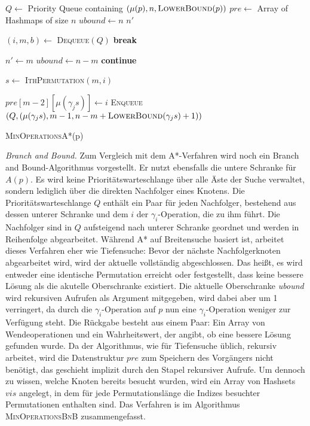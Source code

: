 \documentclass[a4paper, 10pt, ngerman]{article}
\begin{document}
\begin{algorithm}

    $Q \gets$ Priority Queue containing $(\mu(p), n, \textsc{LowerBound}(p))$ \;
    $pre \gets$ Array of Hashmaps of size $n$ \;
    $ubound \gets n$ \;
    $n'$ \;

    {
        $(i, m, b) \gets$ \textsc{Dequeue}$(Q)$ \;
        {
            \textbf{break} \;
        }

        {
            {
                $n' \gets m$ \;
                $ubound \gets n - m$ \;
            }
            \textbf{continue} \;
        }

        $s \gets$ \textsc{IthPermutation}$(m, i)$ \;

        {
            {
                $pre[m - 2][\mu(\gamma_j s)] \gets i$ \;
                \textsc{Enqueue}$(Q, (\mu(\gamma_j s), m - 1, n - m + \textsc{LowerBound}(\gamma_j s) + 1))$ \;
            }
        }
    }

     \;

    \caption{\textsc{MinOperationsA*}(p)}
\end{algorithm}
\bigskip

\emph{Branch and Bound.} Zum Vergleich mit dem A*-Verfahren wird noch ein Branch and Bound-Algorithmus vorgestellt. Er nutzt ebensfalls die untere Schranke für $A(p)$. Es wird keine Prioritätswarteschlange über alle Äste der Suche verwaltet, sondern lediglich über die direkten Nachfolger eines Knotens. Die Prioritätswarteschlange $Q$ enthält ein Paar für jeden Nachfolger, bestehend aus dessen unterer Schranke und dem $i$ der $\gamma_i$-Operation, die zu ihm führt. Die Nachfolger sind in $Q$ aufsteigend nach unterer Schranke geordnet und werden in Reihenfolge abgearbeitet. Während A* auf Breitensuche basiert ist, arbeitet dieses Verfahren eher wie Tiefensuche: Bevor der nächste Nachfolgerknoten abgearbeitet wird, wird der aktuelle vollständig abgeschlossen. Das heißt, es wird entweder eine identische Permutation erreicht oder festgestellt, dass keine bessere Lösung als die akutelle Oberschranke existiert. Die aktuelle Oberschranke \emph{ubound} wird rekursiven Aufrufen als Argument mitgegeben, wird dabei aber um 1 verringert, da durch die $\gamma_i$-Operation auf $p$ nun eine $\gamma_i$-Operation weniger zur Verfügung steht. Die Rückgabe besteht aus einem Paar: Ein Array von Wendeoperationen und ein Wahrheitswert, der angibt, ob eine bessere Lösung gefunden wurde. Da der Algorithmus, wie für Tiefensuche üblich, rekursiv arbeitet, wird die Datenstruktur $pre$ zum Speichern des Vorgängers nicht benötigt, das geschieht implizit durch den Stapel rekursiver Aufrufe. Um dennoch zu wissen, welche Knoten bereits besucht wurden, wird ein Array von Hashsets $vis$ angelegt, in dem für jede Permutationslänge die Indizes besuchter Permutationen enthalten sind. Das Verfahren is im Algorithmus \textsc{MinOperationsBnB} zusammengefasst.
\end{document}
